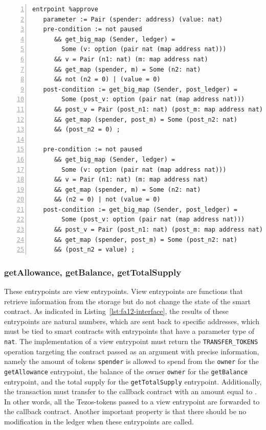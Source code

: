 \documentclass[a4paper,USenglish,cleveref, autoref, thm-restate]{lipics-v2021}
\begin{document}
\begin{lstlisting}[float=tp,captionpos=b,caption={Specification of the \lstinline/approve/ entrypoint},label={lst:specification-approve},numbers=left]
entrpoint %approve
   parameter := Pair (spender: address) (value: nat)
   pre-condition := not paused 
      && get_big_map (Sender, ledger) = 
        Some (v: option (pair nat (map address nat))) 
      && v = Pair (n1: nat) (m: map address nat) 
      && get_map (spender, m) = Some (n2: nat) 
      && not (n2 = 0) | (value = 0)
   post-condition := get_big_map (Sender, post_ledger) = 
        Some (post_v: option (pair nat (map address nat))) 
      && post_v = Pair (post_n1: nat) (post_m: map address nat) 
      && get_map (spender, post_m) = Some (post_n2: nat) 
      && (post_n2 = 0) ;

   pre-condition := not paused 
      && get_big_map (Sender, ledger) = 
        Some (v: option (pair nat (map address nat))) 
      && v = Pair (n1: nat) (m: map address nat) 
      && get_map (spender, m) = Some (n2: nat) 
      && (n2 = 0) | not (value = 0)
   post-condition := get_big_map (Sender, post_ledger) = 
        Some (post_v: option (pair nat (map address nat))) 
      && post_v = Pair (post_n1: nat) (post_m: map address nat) 
      && get_map (spender, post_m) = Some (post_n2: nat) 
      && (post_n2 = value) ;
\end{lstlisting}

\subsubsection{getAllowance, getBalance,  getTotalSupply}
\label{sec:getall-getb-gett}

These entrypoints are view entrypoints. View entrypoints are functions
that retrieve information from the storage but do not change the state
of the smart contract. As indicated in
Listing~\ref{lst:fa12-interface}, the results of these entrypoints are
natural numbers, which are sent back to specific addresses, which must
be tied to smart contracts with entrypoints that have a parameter type
of \lstinline/nat/. The implementation of a view entrypoint must
return the \lstinline/TRANSFER_TOKENS/ operation targeting the
contract passed as an argument with precise information, namely the
amount of tokens \lstinline/spender/ is allowed to spend from the
\lstinline/owner/ for the \lstinline/getAllowance/ entrypoint, the
balance of the owner \lstinline/owner/ for the \lstinline/getBalance/
entrypoint, and the total supply for the \lstinline/getTotalSupply/
entrypoint. Additionally, the transaction must transfer to the
callback contract with an amount equal to \AMOUNT. In other words, all
the Tezos-tokens passed to a view entrypoint are forwarded to the
callback contract. Another important property is that there should be
no modification in the ledger when these entrypoints are called. 
\end{document}
